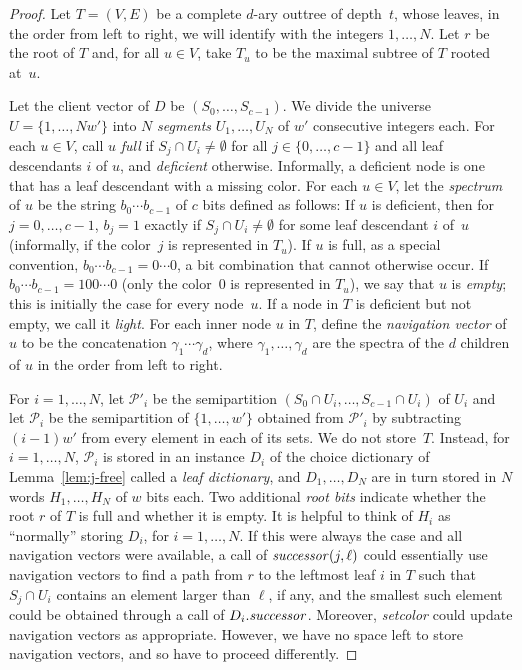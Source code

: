 \documentclass[envcountsame,envcountsect,undated,nolinenumbers]{lnthi}
\def\Tvn#1{\hbox{\textit{#1\/}}}
\begin{document}
\begin{proof}
Let $T=(V,E)$ be a complete $d$-ary outtree of
depth~$t$, whose leaves, in the order from
left to right, we will identify with
the integers $1,\ldots,N$.
Let $r$ be the root of $T$ and, for all $u\in V$,
take $T_u$ to be the maximal subtree of $T$
rooted at~$u$.

Let the client vector of $D$ be
$(S_0,\ldots,S_{c-1})$.
We divide the universe
$U=\{1,\ldots,N w'\}$ into $N$
\emph{segments} 
$U_1,\ldots,U_N$ of $w'$ consecutive integers each.
For each $u\in V$, call $u$ \emph{full}
if $S_j\cap U_i\not=\emptyset$ for all
$j\in\{0,\ldots,c-1\}$ and all leaf
descendants $i$ of $u$, and
\emph{deficient} otherwise.
Informally, a deficient node is one that has a
leaf descendant with a missing color.
For each $u\in V$, let the \emph{spectrum} of $u$
be the string $b_0\cdots b_{c-1}$ of $c$
bits defined as follows:
If $u$ is deficient,
then for $j=0,\ldots,c-1$, $b_j=1$
exactly if $S_j\cap U_i\not=\emptyset$
for some leaf descendant $i$ of~$u$
(informally, if the color~$j$ is represented in $T_u$).
If $u$ is full, as a special convention,
$b_0\cdots b_{c-1}=0\cdots 0$, a
bit combination that cannot otherwise occur.
If $b_0\cdots b_{c-1}=100\cdots 0$
(only the color~0 is represented in $T_u$),
we say that $u$ is \emph{empty};
this is initially the case for every node~$u$.
If a node in $T$ is deficient but not empty,
we call it \emph{light}.
For each inner node $u$ in $T$, define the
\emph{navigation vector} of $u$ to be the concatenation
$\gamma_1\cdots \gamma_d$, where $\gamma_1,\ldots,\gamma_d$ are the
spectra of the $d$ children of $u$ in the
order from left to right.

For $i=1,\ldots,N$, let $\mathcal{P}'_i$
be the semipartition
$(S_0\cap U_i,\ldots,S_{c-1}\cap U_i)$ of $U_i$
and let $\mathcal{P}_i$ be the semipartition
of $\{1,\ldots,w'\}$ obtained from $\mathcal{P}'_i$
by subtracting $(i-1)w'$ from every element
in each of its sets.
We do not store~$T$.
Instead, for $i=1,\ldots,N$, $\mathcal{P}_i$
is stored in an instance $D_i$ of the
choice dictionary of Lemma~\ref{lem:j-free}
called a \emph{leaf dictionary},
and $D_1,\ldots,D_N$ are in turn stored
in $N$ words $H_1,\ldots,H_N$ of $w$ bits each.
Two additional \emph{root bits} indicate whether the root $r$
of $T$ is full and whether it is empty.
It is helpful to think of $H_i$ as ``normally''
storing $D_i$,
for $i=1,\ldots,N$.
If this were always the case and all navigation vectors
were available, a call of $\Tvn{successor}(j,\ell)$
could essentially use navigation vectors to find
a path from $r$ to the leftmost leaf $i$ in $T$
such that $S_j\cap U_i$ contains an 
element larger than $\ell$, if any,
and the smallest such element
could be obtained through a call of
$D_i.\Tvn{successor}$.
Moreover, \Tvn{setcolor}
could update navigation vectors as appropriate.
However, we have no space left to store
navigation vectors, and so have to proceed differently.


\end{proof}
\end{document}
